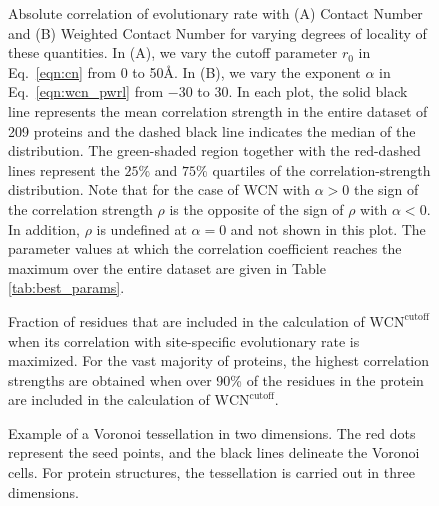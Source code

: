 \documentclass[12pt]{article}
\begin{document}
    \begin{figure}
        \caption{Absolute correlation of evolutionary rate with (A) Contact Number and (B) Weighted Contact Number for varying degrees of locality of these quantities. In (A), we vary the cutoff parameter $r_0$ in Eq.~\ref{eqn:cn} from 0 to 50\AA. In (B), we vary the exponent $\alpha$ in Eq.~\ref{eqn:wcn_pwrl} from $-30$ to 30. In each plot, the solid black line represents the mean correlation strength in the entire dataset of 209 proteins and the dashed black line indicates the median of the distribution. The green-shaded region together with the red-dashed lines represent the $25\%$ and $75\%$ quartiles of the correlation-strength distribution. Note that for the case of WCN with $\alpha>0$ the sign of the correlation strength $\rho$ is the opposite of the sign of $\rho$ with $\alpha<0$. In addition, $\rho$ is undefined at $\alpha=0$ and not shown in this plot. The parameter values at which the correlation coefficient reaches the maximum over the entire dataset are given in Table \ref{tab:best_params}.}
        \label{fig:cnwcnp}
    \end{figure}

    \begin{figure}
        \caption{Fraction of residues that are included in the calculation of $\text{WCN}^\text{cutoff}$ when its correlation with site-specific evolutionary rate is maximized. For the vast majority of proteins, the highest correlation strengths are obtained when over 90\% of the residues in the protein are included in the calculation of $\text{WCN}^\text{cutoff}$.}
        \label{fig:wcn_pwrl_cutoff}
    \end{figure}
    
    \begin{figure}
        \caption{Example of a Voronoi tessellation in two dimensions. The red dots represent the seed points, and the black lines delineate the Voronoi cells. For protein structures, the tessellation is carried out in three dimensions.}
        \label{fig:voronoi}
    \end{figure}
\end{document}

